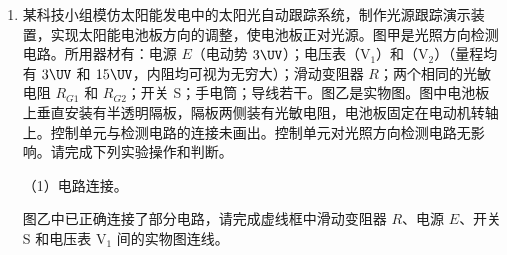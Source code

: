 \documentclass[\gkver]{gaokaozhenti}
\begin{document}
\begin{enumerate}
（3）在“用双缝干涉实验测量光的波长”实验调节过程中，在光具座上安装光源、遮光筒和光屏。遮光筒不可调节。打开并调节。使光束沿遮光筒的轴线把光屏照亮。取下光屏，装上单缝、双缝和测量头。调节测量头，并缓慢调节单缝的角度直到目镜中观察到。




\item
某科技小组模仿太阳能发电中的太阳光自动跟踪系统，制作光源跟踪演示装置，实现太阳能电池板方向的调整，使电池板正对光源。图甲是光照方向检测电路。所用器材有：电源 $E$（电动势 $3 \UV$）；电压表（V$_{1}$）和（V$_{2}$）（量程均有 $3 \UV$ 和 $15 \UV$，内阻均可视为无穷大）；滑动变阻器 $R$；两个相同的光敏电阻 $R_{G1}$ 和 $R_{G2}$；开关 S；手电筒；导线若干。图乙是实物图。图中电池板上垂直安装有半透明隔板，隔板两侧装有光敏电阻，电池板固定在电动机转轴上。控制单元与检测电路的连接未画出。控制单元对光照方向检测电路无影响。请完成下列实验操作和判断。

（1）电路连接。

图乙中已正确连接了部分电路，请完成虚线框中滑动变阻器 $R$、电源 $E$、开关 S 和电压表 V$_{1}$ 间的实物图连线\tkanswer[2cm]{}。


\end{enumerate}
\end{document}
